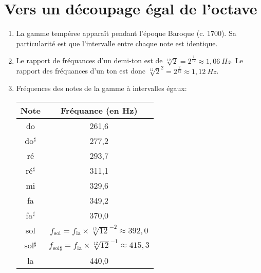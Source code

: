 \documentclass[12pt]{article}
\begin{document}
    \section{Vers un découpage égal de l'octave}
    \begin{enumerate}
        \item La gamme tempéree apparaît pendant l'époque Baroque (c. 1700). Sa particularité est que l'intervalle entre chaque note est identique.
        \item Le rapport de fréquances d'un demi-ton est de $\sqrt[12]{2}=2^{\frac{1}{12}}\approx 1{,}06\ \si{Hz}$. Le rapport des fréquances d'un ton est donc $\sqrt[12]{2}^2=2^{\frac{2}{12}}\approx 1{,}12\ \si{Hz}$.
        \item Fréquences des notes de la gamme à intervalles égaux:
                \begin{longtable}{ |c|c| } \hline \endfirsthead
                    \textbf{Note} & \textbf{Fréquance} (en Hz) \\ \hline
                    do            & 261{,}6                                                                   \\ \hline
                    do$^\sharp$   & 277{,}2                                                                   \\ \hline
                    ré            & 293{,}7                                                                   \\ \hline
                    ré$^\sharp$   & 311{,}1                                                                   \\ \hline
                    mi            & 329{,}6                                                                   \\ \hline
                    fa            & 349{,}2                                                                   \\ \hline
                    fa$^\sharp$   & 370{,}0                                                                   \\ \hline
                    sol           &$f_\text{sol}=f_\text{la}\times\sqrt[12]{12}^{-2}\approx 392{,}0$          \\ \hline
                    sol$^\sharp$  & $f_{\text{sol}\sharp}=f_\text{la}\times\sqrt[12]{12}^{-1}\approx 415{,}3$ \\ \hline
                    la            & 440{,}0                                                                   \\ \hline

\end{longtable}
\end{enumerate}
\end{document}
